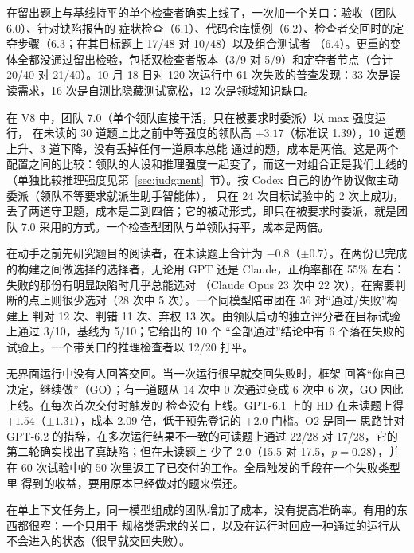 在留出题上与基线持平的单个检查者确实上线了，一次加一个关口：验收（团队 6.0）、针对缺陷报告的
症状检查（6.1）、代码仓库惯例（6.2）、检查者交回时的定夺步骤（6.3；在其目标题上 17/48 对 10/48）以及组合测试者
（6.4）。更重的变体全都没通过留出检验，包括双检查者版本（3/9 对 5/9）和定夺者节点（合计 20/40 对 21/40）。10 月 18 日对
120 次运行中 61 次失败的普查发现：33 次是误读需求，16 次是自测比隐藏测试宽松，12 次是领域知识缺口。

在 V8 中，团队 7.0（单个领队直接干活，只在被要求时委派）以 max 强度运行，
在未读的 30 道题上比之前中等强度的领队高 $+3.17$（标准误 1.39），10 道题上升、3 道下降，没有丢掉任何一道原本总能
通过的题，成本是两倍。这是两个配置之间的比较：领队的人设和推理强度一起变了，而这一对组合正是我们上线的
（单独比较推理强度见第~\ref{sec:judgment}~节）。按 Codex 自己的协作协议做主动委派（领队不等要求就派生助手智能体），
只在 24 次目标试验中的 2 次上成功，丢了两道守卫题，成本是二到四倍；它的被动形式，即只在被要求时委派，就是团队 7.0
采用的方式。一个检查型团队与单领队持平，成本是两倍。

在动手之前先研究题目的阅读者，在未读题上合计为 $-0.8$（$\pm 0.7$）。在两份已完成
的构建之间做选择的选择者，无论用 GPT 还是 Claude，正确率都在 55\% 左右：失败的那份有明显缺陷时几乎总能选对
（Claude Opus 23 次中 22 次），在需要判断的点上则很少选对（28 次中 5 次）。一个同模型陪审团在 36 对“通过/失败”构建上
判对 12 次、判错 11 次、弃权 13 次。由领队启动的独立评分者在目标试验上通过 3/10，基线为 5/10；它给出的 10 个
“全部通过”结论中有 6 个落在失败的试验上。一个带关口的推理检查者以 12/20 打平。

无界面运行中没有人回答交回。当一次运行很早就交回失败时，框架
回答“你自己决定，继续做”（GO）；有一道题从 14 次中 0 次通过变成 6 次中 6 次，GO 因此上线。在每次首次交付时触发的
检查没有上线。GPT-6.1 上的 HD 在未读题上得 $+1.54$（$\pm 1.31$），成本 2.09 倍，低于预先登记的 $+2.0$ 门槛。O2 是同一
思路针对 GPT-6.2 的措辞，在多次运行结果不一致的可读题上通过 22/28 对 17/28，它的第二轮确实找出了真缺陷；但在未读题上
少了 2.0（15.5 对 17.5，$p = 0.28$），并在 60 次试验中的 50 次里返工了已交付的工作。全局触发的手段在一个失败类型里
得到的收益，要用原本已经做对的题来偿还。

在单上下文任务上，同一模型组成的团队增加了成本，没有提高准确率。有用的东西都很窄：一个只用于
规格类需求的关口，以及在运行时回应一种通过的运行从不会进入的状态（很早就交回失败）。
